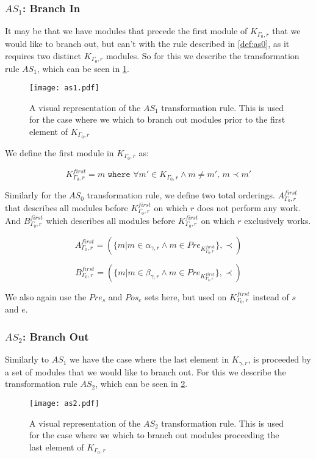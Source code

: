 \subsubsection{$AS_1$: Branch In}\label{sssec:bi}
It may be that we have modules that precede the first module of $K_{\Gamma_0 ,r}$ that we would like to branch out, but can't with the rule described in \cref{def:as0}, as it requires two distinct $K_{\Gamma_0 ,r}$ modules. So for this we describe the transformation rule $AS_1$, which can be seen in \cref{fig:as1}.

\begin{figure}[H]
	\centering
	\texttt{[image: as1.pdf]}
	\caption{A visual representation of the $AS_1$ transformation rule. This is used for the case where we which to branch out modules prior to the first element of $K_{\Gamma_0 ,r}$}
	\label{fig:as1}
\end{figure}


 We define the first module in $K_{\Gamma_0 ,r}$ as:

\[K_{\Gamma_0 ,r}^{first} = m \texttt{ where } \forall m' \in K_{\Gamma_0 ,r} \land m \neq m',\, m \prec m' \] 

Similarly for the $AS_0$ transformation rule, we define two total orderings. $A_{\Gamma_0 ,r}^{first}$ that describes all modules before $K_{\Gamma_0 ,r}^{first}$ on which $r$ does not perform any work. And $B_{\Gamma_0 ,r}^{first}$ which describes all modules before $K_{\Gamma_0 ,r}^{first}$ on which $r$ exclusively works.

\[ A_{\Gamma_0 ,r}^{first} = (\{m | m \in \alpha_{\gamma ,r}  \land m \in Pre_{K_{\Gamma_0 ,r}^{first}} \}, \prec) \]

\[ B_{\Gamma_0 ,r}^{first} = (\{m | m \in \beta_{\gamma ,r}  \land m \in Pre_{K_{\Gamma_0 ,r}^{first}} \}, \prec) \]

We also again use the $Pre_s$ and $Pos_e$ sets here, but used on $K_{\Gamma_0 ,r}^{first}$ instead of $s$ and $e$.
  

\subsubsection{$AS_2$: Branch Out}
Similarly to $AS_1$ we have the case where the last element in $K_{\gamma ,r}$, is proceeded by a set of modules that we would like to branch out. For this we describe the transformation rule $AS_2$, which can be seen in \cref{fig:as2}.

\begin{figure}[H]
	\centering
	\texttt{[image: as2.pdf]}
	\caption{A visual representation of the $AS_2$ transformation rule. This is used for the case where we which to branch out modules proceeding the last element of $K_{\Gamma_0 ,r}$}
	\label{fig:as2}
\end{figure}


